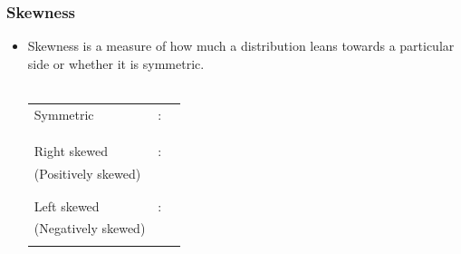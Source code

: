 \documentclass[xcolor=svgnames, compress]{beamer}
\begin{document}

\begin{frame}
\frametitle{Skewness}

\vspace{-0.5cm}

\begin{itemize}
\justifying
\item	\alert{Skewness} is a measure of how much a distribution leans towards a particular side or whether it is symmetric.\\
	\hfill\\
	\begin{tabular}{lcl}
	\justifying
	\alert{Symmetric}		& : 	&	\makebox[5.65cm][s]{Most observations are concentrated}	\\
						&	&	\makebox[5.65cm][s]{around the mean and tail off fairly}		\\
						&	&	\makebox[5.25cm][s]{evenly on both sides of the mean.}		\\
	\hfill\\
	\alert{Right skewed}		& :	&	\makebox[5.65cm][s]{We observe a tail to the right side} 	\\
		(Positively skewed)	&	&	\makebox[5.65cm][s]{of the mean. More observations are}	\\
						&	&	\makebox[5.25cm][s]{concentrated on smaller values.}	\\
	\hfill\\
	\alert{Left skewed}		& :	&	\makebox[5.65cm][s]{We observe a tail to the left side} 	\\
		(Negatively skewed)	&	&	\makebox[5.65cm][s]{of the mean. More observations are}	\\
						&	&	\makebox[5.25cm][s]{concentrated on larger values.}		\\
	
	\end{tabular}
\hfill\\
\end{itemize}

\end{frame}




\end{document}
